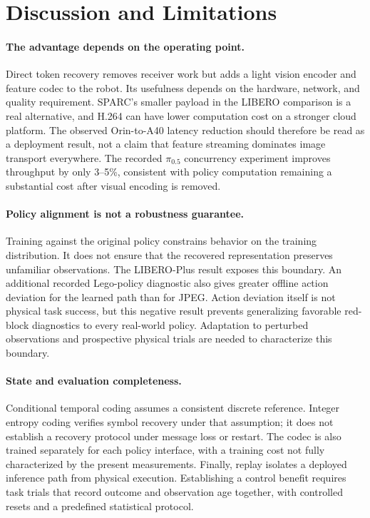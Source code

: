 \section{Discussion and Limitations}
\label{sec:limitations}
\paragraph{The advantage depends on the operating point.}
Direct token recovery removes receiver work but adds a light vision encoder
and feature codec to the robot. Its usefulness depends on the hardware,
network, and quality requirement. SPARC's smaller payload in the LIBERO
comparison is a real alternative, and H.264 can have lower computation
cost on a stronger cloud platform. The observed Orin-to-A40 latency
reduction should therefore be read as a deployment result, not a claim
that feature streaming dominates image transport everywhere. The
recorded $\pi_{0.5}$ concurrency experiment improves throughput by only
3--5\%, consistent with policy computation remaining a substantial cost
after visual encoding is removed.

\paragraph{Policy alignment is not a robustness guarantee.}
Training against the original policy constrains behavior on the training
distribution. It does not ensure that the recovered representation
preserves unfamiliar observations. The LIBERO-Plus result exposes this
boundary. An additional recorded Lego-policy diagnostic also gives
greater offline action deviation for the learned path than for JPEG.
Action deviation itself is not physical task success, but this negative
result prevents generalizing favorable red-block diagnostics to every
real-world policy. Adaptation to perturbed observations and prospective
physical trials are needed to characterize this boundary.

\paragraph{State and evaluation completeness.}
Conditional temporal coding assumes a consistent discrete reference. Integer
entropy coding verifies symbol recovery under that assumption; it does
not establish a recovery protocol under message loss or restart. The
codec is also trained separately for each policy interface, with a
training cost not fully characterized by the present measurements.
Finally, replay isolates a deployed inference path from physical
execution. Establishing a control benefit requires task trials that
record outcome and observation age together, with controlled resets
and a predefined statistical protocol.
